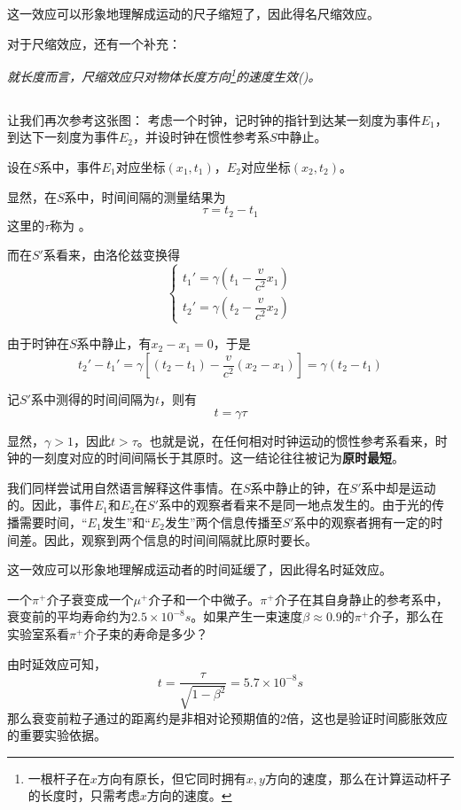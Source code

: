 这一效应可以形象地理解成运动的尺子缩短了，因此得名尺缩效应。

对于尺缩效应，还有一个补充：
\begin{center}
	\em 就长度而言，尺缩效应只对物体长度方向\footnote{\eg 一根杆子在$x$方向有原长，但它同时拥有$x,y$方向的速度，那么在计算运动杆子的长度时，只需考虑$x$方向的速度。}的速度生效()。
\end{center}

\subsection[动钟变慢]{}
让我们再次参考这张图：
考虑一个时钟，记时钟的指针到达某一刻度为事件$E_1$，到达下一刻度为事件$E_2$，并设时钟在惯性参考系$S$中静止。

设在$S$系中，事件$E_1$对应坐标$(x_1,t_1)$，$E_2$对应坐标$(x_2,t_2)$。

显然，在$S$系中，时间间隔的测量结果为
\[\tau=t_2-t_1\] 
这里的$\tau$称为 。

而在$S'$系看来，由洛伦兹变换得
\[\left\{\begin{array}{l}
	t_1'=\gamma(t_1-\dfrac{v}{c^2} x_1)\\[1ex]
	t_2'=\gamma(t_2-\dfrac{v}{c^2} x_2)
\end{array}\right.\]

由于时钟在$S$系中静止，有$x_2-x_1=0$，于是
\[t_2'-t_1'=\gamma[(t_2-t_1)-\dfrac{v}{c^2}(x_2-x_1)]=\gamma(t_2-t_1)\]

记$S'$系中测得的时间间隔为$t$，则有
\begin{equation}
	t=\gamma\tau
\end{equation}

显然，$\gamma > 1$，因此$t>\tau$。也就是说，在任何相对时钟运动的惯性参考系看来，时钟的一刻度对应的时间间隔长于其原时。这一结论往往被记为\textbf{原时最短}。

我们同样尝试用自然语言解释这件事情。在$S$系中静止的钟，在$S'$系中却是运动的。因此，事件$E_1$和$E_2$在$S'$系中的观察者看来不是同一地点发生的。由于光的传播需要时间，``$E_1$发生''和``$E_2$发生''两个信息传播至$S'$系中的观察者拥有一定的时间差。因此，观察到两个信息的时间间隔就比原时要长。

这一效应可以形象地理解成运动者的时间延缓了，因此得名时延效应。
\begin{ex}[$\pi^+$介子衰变]
    一个$\pi^+$介子衰变成一个$\mu^+$介子和一个中微子。$\pi^+$介子在其自身静止的参考系中，衰变前的平均寿命约为$2.5\times10^{-8}s$。如果产生一束速度$\beta\approx 0.9$的$\pi^+$介子，那么在实验室系看$\pi^+$介子束的寿命是多少？
\end{ex}
\begin{so}[$\pi^+$介子衰变]
    由时延效应可知，
    \[t=\frac{\tau}{\sqrt{1-\beta^2}}=5.7\times10^{-8}s\]
    那么衰变前粒子通过的距离约是非相对论预期值的2倍，这也是验证时间膨胀效应的重要实验依据。
\end{so}

